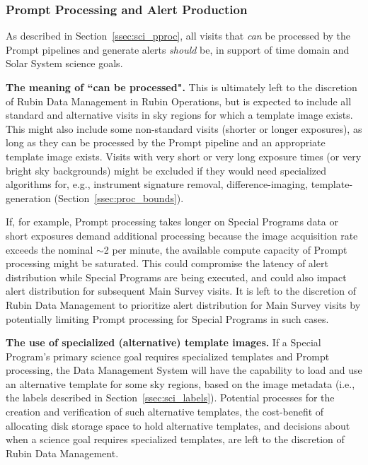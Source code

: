 \subsubsection{Prompt Processing and Alert Production}\label{sssec:proc_reg_prompt}

As described in Section~\ref{ssec:sci_pproc}, 
all visits that \emph{can} be processed by the Prompt pipelines and generate 
alerts \emph{should} be, in support of time domain and Solar System science goals.

\textbf{The meaning of ``can be processed".}
This is ultimately left to the discretion of
Rubin Data Management in Rubin Operations, but is expected to include
all standard and alternative visits in sky regions for which a template image exists.
This might also include some non-standard visits (shorter or longer exposures), 
as long as they can be processed by the Prompt pipeline and an appropriate template image exists.
Visits with very short or very long exposure times (or very bright sky 
backgrounds) might be excluded if they would need specialized algorithms for,
e.g., instrument signature removal, difference-imaging, template-generation 
(Section~\ref{ssec:proc_bounds}).

If, for example, Prompt processing takes longer on Special Programs data or short exposures demand
additional processing because the image acquisition rate exceeds the nominal $\sim$2 per minute,
the available compute capacity of Prompt processing might be saturated.
This could compromise the latency of alert distribution while Special Programs are being executed,
and could also impact alert distribution for subsequent Main Survey visits.
It is left to the discretion of Rubin Data Management to prioritize alert distribution
for Main Survey visits by potentially limiting Prompt processing for Special Programs in such cases.

\textbf{The use of specialized (alternative) template images.}
If a Special Program's primary science goal requires specialized templates and
Prompt processing, the Data Management System will have the capability to load
and use an alternative template for some sky regions, based on the image metadata
(i.e., the labels described in Section~\ref{ssec:sci_labels}).
Potential processes for the creation and verification of such alternative
templates, the cost-benefit of allocating disk storage space to hold
alternative templates, and decisions about when a science goal requires specialized
templates, are left to the discretion of Rubin Data Management.

